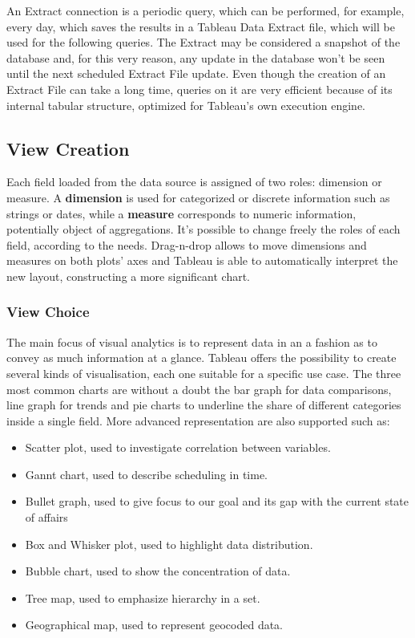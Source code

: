 An Extract connection is a periodic query, which can be performed, for example, every day, which saves the results in a Tableau Data Extract file, which will be used for the following queries. The Extract may be considered a snapshot of the database and, for this very reason, any update in the database won't be seen until the next scheduled Extract File update. Even though the creation of an Extract File can take a long time, queries on it are very efficient because of its internal tabular structure, optimized for Tableau's own execution engine.

\subsection{View Creation}

Each field loaded from the data source is assigned of two roles: dimension or measure. A \textbf{dimension} is used for categorized or discrete information such as strings or dates, while a \textbf{measure} corresponds to numeric information, potentially object of aggregations. It's possible to change freely the roles of each field, according to the needs. Drag-n-drop allows to move dimensions and measures on both plots' axes and Tableau is able to automatically interpret the new layout, constructing a more significant chart.

\subsubsection{View Choice}
The main focus of visual analytics is to represent data in an a fashion as to convey as much information at a glance.
Tableau offers the possibility to create several kinds of visualisation, each one suitable for a specific use case. The three most common charts are without a doubt the bar graph for data comparisons, line graph for trends and pie charts to underline the share of different categories inside a single field.
More advanced representation are also supported such as:

\begin{itemize}
	\item Scatter plot, used to investigate correlation between variables.
	\item Gannt chart, used to describe scheduling in time.
	\item Bullet graph, used to give focus to our goal and its gap with the current state of affairs
	\item Box and Whisker plot, used to highlight data distribution.
	\item Bubble chart, used to show the concentration of data.
	\item Tree map, used to emphasize hierarchy in a set.
	\item Geographical map, used to represent geocoded data.
\end{itemize} 

